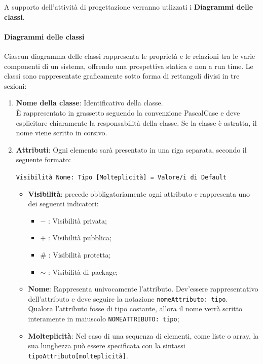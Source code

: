 A supporto dell'attività di progettazione verranno utlizzati i \textbf{Diagrammi delle classi}. \\

\paragraph*{Diagrammi delle classi}
Ciascun diagramma delle classi rappresenta le proprietà e le relazioni tra le varie componenti di un sistema, offrendo una prospettiva statica e non a run time.
Le classi sono rappresentate graficamente sotto forma di rettangoli divisi in tre sezioni:
\begin{enumerate}
    \item \textbf{Nome della classe}: Identificativo della classe. \\
    È rappresentato in grassetto seguendo la convenzione PascalCase e deve esplicitare chiaramente la responsabilità della classe. Se la classe è astratta, il nome viene scritto in corsivo.
    \item \textbf{Attributi}: Ogni elemento sarà presentato in una riga separata, secondo il seguente formato: \\
    \begin{center}\texttt{Visibilità Nome: Tipo [Molteplicità] = Valore/i di Default}\end{center}
    \begin{itemize}
        \item \textbf{Visibilità}: precede obbligatoriamente ogni attributo e rappresenta uno dei seguenti indicatori:
        \begin{itemize}
            \item $-$ : Visibilità privata;
            \item $+$ : Visibilità pubblica;
            \item $\#$ : Visibilità protetta;
            \item $\sim$ : Visibilità di package;
        \end{itemize}
        \item \textbf{Nome}: Rappresenta univocamente l'attributo. Dev'essere rappresentativo dell'attributo e deve seguire la notazione \texttt{nomeAttributo: tipo}. \\
        Qualora l'attributo fosse di tipo costante, allora il nome verrà scritto interamente in maiuscolo \texttt{NOMEATTRIBUTO: tipo};
        \item \textbf{Molteplicità}: Nel caso di una sequenza di elementi, come liste o array, la sua lunghezza può essere specificata con la sintassi \texttt{tipoAttributo[molteplicità]}. \\

\end{itemize}
\end{enumerate}
